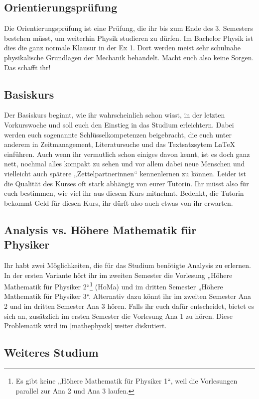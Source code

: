 \subsection{Orientierungsprüfung}

Die Orientierungsprüfung ist eine Prüfung, die ihr bis zum Ende des 3. Semesters bestehen müsst, um weiterhin Physik studieren zu dürfen. Im Bachelor Physik ist dies die ganz normale Klausur in der Ex 1. Dort werden meist sehr schulnahe physikalische Grundlagen der Mechanik behandelt. Macht euch also keine Sorgen. Das schafft ihr!

\subsection{Basiskurs}

Der Basiskurs beginnt, wie ihr wahrscheinlich schon wisst, in der letzten Vorkurswoche und soll euch den Einstieg in das Studium erleichtern. Dabei werden euch sogenannte Schlüsselkompetenzen beigebracht, die euch unter anderem in Zeitmanagement, Literatursuche und das Textsatzsytem \LaTeX{} einführen. Auch wenn ihr vermutlich schon einiges davon kennt, ist es doch ganz nett, nochmal alles kompakt zu sehen und vor allem dabei neue Menschen und vielleicht auch spätere „Zettelpartnerinnen“ kennenlernen zu können. Leider ist die Qualität des Kurses oft stark abhängig von eurer Tutorin. Ihr müsst also für euch bestimmen, wie viel ihr aus diesem Kurs mitnehmt. Bedenkt, die Tutorin bekommt Geld für diesen Kurs, ihr dürft also auch etwas von ihr erwarten. 

\subsection{Analysis vs. Höhere Mathematik für \\Physiker}
Ihr habt zwei Möglichkeiten, die für das Studium benötigte Analysis zu erlernen.
In der ersten Variante hört ihr im zweiten Semester die Vorlesung „Höhere Mathematik für Physiker 2“\footnote{Es gibt keine „Höhere Mathematik für Physiker 1“, weil die Vorlesungen parallel zur Ana 2 und Ana 3 laufen.} (\gls{HoMa}) und im dritten Semester „Höhere Mathematik für Physiker 3“. Alternativ dazu könnt ihr im zweiten Semester Ana 2 und im dritten Semester Ana 3 hören. Falls ihr euch dafür entscheidet, bietet es sich an, zusätzlich im ersten Semester die Vorlesung Ana 1 zu hören. Diese Problematik wird im \autoref{mathephysik} weiter diskutiert.

\subsection{Weiteres Studium}

